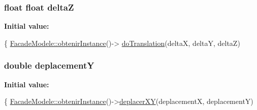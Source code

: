 \subsubsection[{delta\+Z}]{\setlength{\rightskip}{0pt plus 5cm}float float delta\+Z}\label{group__inf2990_ga9644447719a7934b7eca34bdf6656363}
{\bfseries Initial value\+:}
\begin{DoxyCode}
\{
        \hyperlink{group__inf2990_ga63593b81c6f3cc2251e2b61d9e8fc670}{FacadeModele::obtenirInstance}()->
      \hyperlink{group__inf2990_ga3c29bb5fb742aacf7bea3f62357c4f48}{doTranslation}(deltaX, deltaY, deltaZ)
\end{DoxyCode}
\hypertarget{group__inf2990_ga84b180f09e9802d980aa3f7cc71703da}{}
\subsubsection[{deplacement\+Y}]{\setlength{\rightskip}{0pt plus 5cm}double deplacement\+Y}\label{group__inf2990_ga84b180f09e9802d980aa3f7cc71703da}
{\bfseries Initial value\+:}
\begin{DoxyCode}
\{
        \hyperlink{group__inf2990_ga63593b81c6f3cc2251e2b61d9e8fc670}{FacadeModele::obtenirInstance}()->\hyperlink{group__inf2990_ga1d0468d14d18990c39861b22d4921a7c}{deplacerXY}(deplacementX, 
      deplacementY)
\end{DoxyCode}
